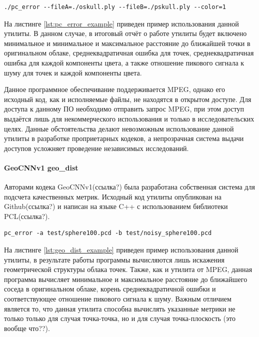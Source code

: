 \begin{lstlisting}[caption={
    Пример использования утилиты mpeg-pcc-dmetric, параметр fileA -
    оригинальное облако, fileB - реконструированное облако, color=1 - также
    вычисляются значения искажения цветов.
}, label={lst:pc_error_example}]
./pc_error --fileA=./oskull.ply --fileB=./pskull.ply --color=1
\end{lstlisting}

На листинге \ref{lst:pc_error_example} приведен пример использования данной
утилиты. В данном случае, в итоговый отчёт о работе утилиты будет включено
минимальное и минимальное и максимальное расстояние до ближайшей точки в
оригинальном облаке, среднеквадратичная ошибка для точек, среднеквадратичная
ошибка для каждой компоненты цвета, а также отношение пикового сигнала к шуму
для точек и каждой компоненты цвета.

Данное программное обеспечивание поддерживается MPEG, однако его исходный код,
как и исполняемые файлы, не находятся в открытом доступе. Для доступа к данному
ПО необходимо отправить запрос MPEG, при этом доступ выдаётся лишь для
некоммерческого использования и только в исследовательских целях. Данные
обстоятельства делают невозможным использование данной утилиты в разработке
проприетарных кодеков, а непрозрачная система выдачи доступов усложняет
проведение независимых исследований.

\paragraph{GeoCNNv1 geo\_dist}

Авторами кодека GeoCNNv1(ссылка?) была разработана собственная система для
подсчета качественных метрик. Исходный код утилиты опубликован на
Github(ссылка?) и написан на языке C++ с использованием библиотеки PCL(ссылка?).

\begin{lstlisting}[caption={
    Пример использования утилиты geo\_dist, параметр a - оригинальное облако, b
    - реконструированное облако.
}, label={lst:geo_dist_example}]
pc_error -a test/sphere100.pcd -b test/noisy_sphere100.pcd
\end{lstlisting}

На листинге \ref{lst:geo_dist_example} приведен пример использования данной
утилиты, в результате работы программы вычисляются лишь искажения геометрической
структуры облака точек. Также, как и утилита от MPEG, данная программа вычисляет
минимальное и максимальное расстояние до ближайшего соседа в оригинальном
облаке, корень среднеквадратичной ошибки и соответствующее отношение пикового
сигнала к шуму. Важным отличием является то, что данная утилита способна
вычислять указанные метрики не только только для случая точка-точка, но и для
случая точка-плоскость (это вообще что??).

